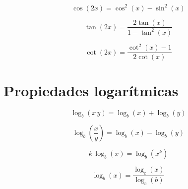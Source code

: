 \begin{equation*}
    \cos{(2x)}=\cos^2{(x)}-\sin^2{(x)}
\end{equation*}

\begin{equation*}
    \tan{(2x)}=\dfrac{2\tan{(x)}}{1-\tan^2{(x)}}
\end{equation*}

\begin{equation*}
    \cot{(2x)}=\dfrac{\cot^2{(x)}-1}{2\cot{(x)}}
\end{equation*}


\section{Propiedades logarítmicas}

\begin{equation*}
    \log_b{(x \, y)} = \log_b{(x)} + \log_b{(y)}
\end{equation*}

\begin{equation*}
    \log_b{\left( \frac{x}{y} \right)} = \log_b{(x)} - \log_b{(y)}
\end{equation*}

\begin{equation*}
    k \, \log_b{(x)} = \log_b{\left( x^k \right)}
\end{equation*}

\begin{equation*}
    \log_b{(x)}=\frac{\log_c{(x)}}{\log_c{(b)}}
\end{equation*}